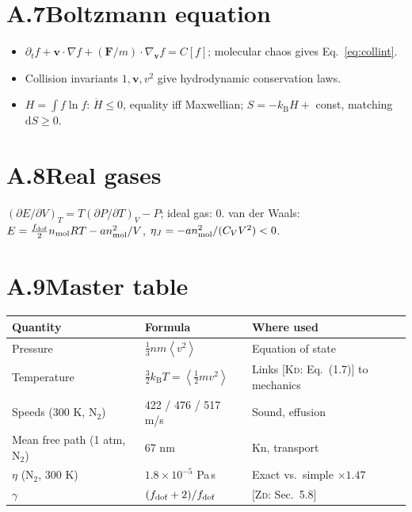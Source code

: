\documentclass[11pt,a4paper]{report}
\theoremstyle{definition}
\theoremstyle{plain}
\newcommand{\KD}[1]{[\textsc{Kd}: #1]}   %
\newcommand{\ZD}[1]{[\textsc{Zd}: #1]}   %
\newcommand{\kB}{k_{\mathrm{B}}}
\newcommand{\dd}{\mathrm{d}}
\newcommand{\avg}[1]{\left\langle #1\right\rangle}
\newcommand{\vv}{\mathbf{v}}
\begin{document}
\section*{A.7\quad Boltzmann equation}
\begin{itemize}[nosep]
\item $\partial_tf+\vv\cdot\nabla f+(\mathbf F/m)\cdot\nabla_{\vv}f=C[f]$; molecular chaos gives Eq.~\eqref{eq:collint}.
\item Collision invariants $1,\vv,v^2$ give hydrodynamic conservation laws.
\item $H=\int f\ln f$: $\dot H\le0$, equality iff Maxwellian; $S=-\kB H+$ const, matching $\dd S\ge0$.
\end{itemize}

\section*{A.8\quad Real gases}
$(\partial E/\partial V)_T=T(\partial P/\partial T)_V-P$; ideal gas: $0$. van der Waals: $E=\tfrac{f_{\rm dof}}2n_{\rm mol}RT-an_{\rm mol}^2/V$, $\eta_J=-an_{\rm mol}^2/(C_VV^2)<0$.

\section*{A.9\quad Master table}
\begin{center}
\small
\begin{tabular}{@{}lll@{}}
\toprule
Quantity & Formula & Where used\\
\midrule
Pressure & $\tfrac13nm\avg{v^2}$ & Equation of state\\
Temperature & $\tfrac32\kB T=\avg{\tfrac12mv^2}$ & Links \KD{Eq.~(1.7)} to mechanics\\
Speeds (300 K, N$_2$) & 422 / 476 / 517 m/s & Sound, effusion\\
Mean free path (1 atm, N$_2$) & 67 nm & Kn, transport\\
$\eta$ (N$_2$, 300 K) & $1.8\times10^{-5}$ Pa\,s & Exact vs.\ simple $\times1.47$\\
$\gamma$ & $(f_{\rm dof}+2)/f_{\rm dof}$ & \ZD{Sec.~5.8}\\
\bottomrule
\end{tabular}
\end{center}
\end{document}
